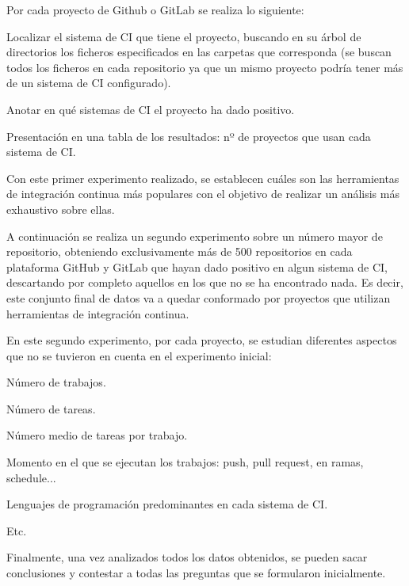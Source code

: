 Por cada proyecto de Github o GitLab se realiza lo siguiente:
\begin{compactitem}
    \item Localizar el sistema de CI que tiene el proyecto, buscando en su árbol de directorios los ficheros especificados en las carpetas que corresponda (se buscan todos los ficheros en cada repositorio ya que un mismo proyecto podría tener más de un sistema de CI configurado).
    \item Anotar en qué sistemas de CI el proyecto ha dado positivo.
    \item Presentación en una tabla de los resultados: nº de proyectos que usan cada sistema de CI.
\end{compactitem}
	
Con este primer experimento realizado, se establecen cuáles son las herramientas de integración continua más populares con el objetivo de realizar un análisis más exhaustivo sobre ellas.

A continuación se realiza un segundo experimento sobre un número mayor de repositorio, obteniendo exclusivamente más de 500 repositorios en cada plataforma GitHub y  GitLab que hayan dado positivo en algun sistema de CI, descartando por completo aquellos en los que no se ha encontrado nada. Es decir, este conjunto final de datos va a quedar conformado por proyectos que utilizan herramientas de integración continua.

En este segundo experimento, por cada proyecto, se estudian diferentes aspectos que no se tuvieron en cuenta en el experimento inicial:
\begin{compactitem}
    \item Número de trabajos.
    \item Número de tareas.
    \item Número medio de tareas por trabajo.
    \item Momento en el que se ejecutan los trabajos: push, pull request, en ramas, schedule...
    \item Lenguajes de programación predominantes en cada sistema de CI.
    \item Etc.
\end{compactitem}

Finalmente, una vez analizados todos los datos obtenidos, se pueden sacar conclusiones y contestar a todas las preguntas que se formularon inicialmente.
	
